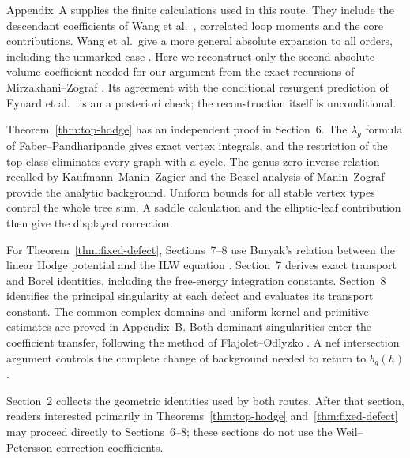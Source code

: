 Appendix~A supplies the finite calculations used in this route.
They include the descendant coefficients of Wang et al.\
\cite[Lemma 7.2 and Appendix C.1]{W26}, correlated loop moments
and the core contributions. Wang et al.\ give a more general
absolute expansion to all orders, including the unmarked case
\cite[Theorem~1.1 and (11.6)--(11.7)]{W26v5}.
Here we reconstruct only the second absolute volume coefficient
needed for our argument from the exact recursions of
Mirzakhani--Zograf \cite[\S 2]{MZ15}. Its agreement with the
conditional resurgent prediction of Eynard et al.\
\cite[\S 6.1, (6.10)]{EGGLS24} is an a posteriori check;
the reconstruction itself is unconditional.

Theorem~\ref{thm:top-hodge} has an independent proof in Section~6.
The $\lambda_g$ formula of Faber--Pandharipande
\cite[Theorem 1]{FP03} gives exact vertex integrals, and the
restriction of the top class eliminates every graph with a cycle.
The genus-zero inverse relation recalled by Kaufmann--Manin--Zagier
\cite[(0.8)]{KMZ96v1} and the Bessel analysis of Manin--Zograf
\cite[\S 6, (17) and Proof 6.3]{MaZ00} provide the analytic
background. Uniform bounds for all stable vertex types control
the whole tree sum. A saddle calculation and the elliptic-leaf
contribution then give the displayed correction.

For Theorem~\ref{thm:fixed-defect}, Sections~7--8 use Buryak's relation
between the linear Hodge potential and the ILW equation
\cite[Theorem 1.1]{Bur15}. Section~7 derives exact transport and
Borel identities, including the free-energy integration constants.
Section~8 identifies the principal singularity at each defect and
evaluates its transport constant. The common complex domains and
uniform kernel and primitive estimates are proved in Appendix~B.
Both dominant singularities enter the coefficient transfer,
following the method of Flajolet--Odlyzko \cite[\S 2]{FO90}.
A nef intersection argument controls the complete change of
background needed to return to $b_g(h)$.

Section~2 collects the geometric identities used by both routes.
After that section, readers interested primarily in
Theorems~\ref{thm:top-hodge} and~\ref{thm:fixed-defect}
may proceed directly to Sections~6--8; these sections do not use
the Weil--Petersson correction coefficients.
